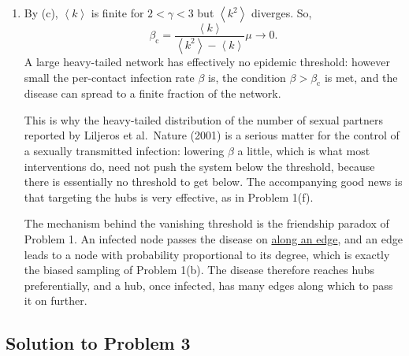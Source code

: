 \documentclass[a4paper,12pt]{article}
\begin{document}
\begin{enumerate}[label=(\alph*)]
\item By (c), $\left\langle k \right\rangle$ is finite for $2<\gamma<3$ but $\left\langle k^2 \right\rangle$ diverges. So,
\[ \beta_{\text{c}} = \frac{\left\langle k \right\rangle}{\left\langle k^2 \right\rangle - \left\langle k \right\rangle}\mu \longrightarrow 0. \]
A large heavy-tailed network has effectively no epidemic threshold: however small the per-contact infection rate $\beta$ is, the condition $\beta>\beta_{\text{c}}$ is met, and the disease can spread to a finite fraction of the network.

This is why the heavy-tailed distribution of the number of sexual partners reported by Liljeros et al.\, Nature (2001) is a serious matter for the control of a sexually transmitted infection: lowering $\beta$ a little, which is what most interventions do, need not push the system below the threshold, because there is essentially no threshold to get below. The accompanying good news is that targeting the hubs is very effective, as in Problem 1(f).

The mechanism behind the vanishing threshold is the friendship paradox of Problem 1. An infected node passes the disease on \underline{along an edge}, and an edge leads to a node with probability proportional to its degree, which is exactly the biased sampling of Problem 1(b). The disease therefore reaches hubs preferentially, and a hub, once infected, has many edges along which to pass it on further.

\end{enumerate}

\subsection*{Solution to Problem 3}
\end{document}

